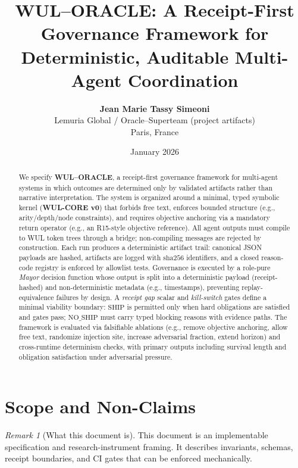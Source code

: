 \documentclass[11pt,a4paper]{article}
\title{\textbf{WUL--ORACLE: A Receipt-First Governance Framework for Deterministic, Auditable Multi-Agent Coordination}}
\author{\textbf{Jean Marie Tassy Simeoni}\\
\small Lemuria Global / Oracle--Superteam (project artifacts)\\
\small Paris, France}
\date{January 2026}
\theoremstyle{plain}
\theoremstyle{definition}
\theoremstyle{remark}
\newtheorem{remark}[theorem]{Remark}
\newcommand{\sha}{\mathrm{sha256}}
\newcommand{\SHIP}{\mathrm{SHIP}}
\newcommand{\NOSHIP}{\mathrm{NO\_SHIP}}
\begin{document}
\maketitle

\begin{abstract}
We specify \textbf{WUL--ORACLE}, a receipt-first governance framework for multi-agent systems in which outcomes are determined only by validated artifacts rather than narrative interpretation. The system is organized around a minimal, typed symbolic kernel (\textbf{WUL-CORE v0}) that forbids free text, enforces bounded structure (e.g., arity/depth/node constraints), and requires objective anchoring via a mandatory return operator (e.g., an R15-style objective reference). All agent outputs must compile to WUL token trees through a bridge; non-compiling messages are rejected by construction. Each run produces a deterministic artifact trail: canonical JSON payloads are hashed, artifacts are logged with \(\sha\) identifiers, and a closed reason-code registry is enforced by allowlist tests. Governance is executed by a role-pure \emph{Mayor} decision function whose output is split into a deterministic payload (receipt-hashed) and non-deterministic metadata (e.g., timestamps), preventing replay-equivalence failures by design. A \emph{receipt gap} scalar and \emph{kill-switch} gates define a minimal viability boundary: \(\SHIP\) is permitted only when hard obligations are satisfied and gates pass; \(\NOSHIP\) must carry typed blocking reasons with evidence paths. The framework is evaluated via falsifiable ablations (e.g., remove objective anchoring, allow free text, randomize injection site, increase adversarial fraction, extend horizon) and cross-runtime determinism checks, with primary outputs including survival length and obligation satisfaction under adversarial pressure.
\end{abstract}

\section{Scope and Non-Claims}
\begin{remark}[What this document is]
This document is an implementable specification and research-instrument framing. It describes invariants, schemas, receipt boundaries, and CI gates that can be enforced mechanically.
\end{remark}
\end{document}
